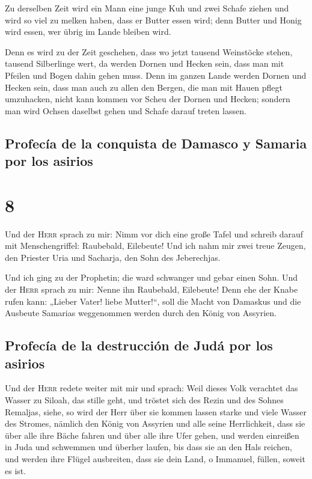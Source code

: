  Zu derselben Zeit wird ein Mann eine junge Kuh und zwei
Schafe ziehen  und wird so viel zu melken haben, dass er
Butter essen wird; denn Butter und Honig wird essen, wer übrig im Lande
bleiben wird.

 Denn es wird zu der Zeit geschehen, dass wo jetzt
tausend Weinstöcke stehen, tausend Silberlinge wert, da werden Dornen
und Hecken sein,  dass man mit Pfeilen und Bogen dahin
gehen muss. Denn im ganzen Lande werden Dornen und Hecken sein,
 dass man auch zu allen den Bergen, die man mit Hauen
pflegt umzuhacken, nicht kann kommen vor Scheu der Dornen und Hecken;
sondern man wird Ochsen daselbst gehen und Schafe darauf treten lassen.

\hypertarget{profecuxeda-de-la-conquista-de-damasco-y-samaria-por-los-asirios}{%
\subsection{Profecía de la conquista de Damasco y Samaria por los
asirios}\label{profecuxeda-de-la-conquista-de-damasco-y-samaria-por-los-asirios}}

\hypertarget{section-7}{%
\section{8}\label{section-7}}

 Und der \textsc{Herr} sprach zu mir: Nimm vor dich eine
große Tafel und schreib darauf mit Menschengriffel: Raubebald,
Eilebeute!  Und ich nahm mir zwei treue Zeugen, den
Priester Uria und Sacharja, den Sohn des Jeberechjas.

 Und ich ging zu der Prophetin; die ward schwanger und
gebar einen Sohn. Und der \textsc{Herr} sprach zu mir: Nenne ihn
Raubebald, Eilebeute!  Denn ehe der Knabe rufen kann:
„Lieber Vater! liebe Mutter!{}``, soll die Macht von Damaskus und die
Ausbeute Samarias weggenommen werden durch den König von Assyrien.

\hypertarget{profecuxeda-de-la-destrucciuxf3n-de-juduxe1-por-los-asirios}{%
\subsection{Profecía de la destrucción de Judá por los
asirios}\label{profecuxeda-de-la-destrucciuxf3n-de-juduxe1-por-los-asirios}}

 Und der \textsc{Herr} redete weiter mit mir und sprach:
 Weil dieses Volk verachtet das Wasser zu Siloah, das
stille geht, und tröstet sich des Rezin und des Sohnes Remaljas,
 siehe, so wird der Herr über sie kommen lassen starke und
viele Wasser des Stromes, nämlich den König von Assyrien und alle seine
Herrlichkeit, dass sie über alle ihre Bäche fahren und über alle ihre
Ufer gehen,  und werden einreißen in Juda und schwemmen
und überher laufen, bis dass sie an den Hals reichen, und werden ihre
Flügel ausbreiten, dass sie dein Land, o Immanuel, füllen, soweit es
ist.

